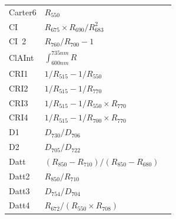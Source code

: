 \documentclass[remotesensing,article,submit,moreauthors,pdftex]{Definitions/mdpi}
\begin{document}
{\begin{supertabular}{lll}
		Carter6         & $R_{550}$                                                                                            & \cite{carter1994}             \\
		CI              & $R_{675}\times R_{690}/R_{683}^2$                                                                    & \cite{zarco-tejada2003}      \\
		CI~2             & $R_{760}/R_{700}-1$                                                                                  & \cite{gitelson2003}           \\
		ClAInt          & $\int_{600 nm}^{735 nm} R$                                                                           & \cite{oppelt2004}             \\
		CRI1            & $1/R_{515}-1/R_{550}$                                                                                & \cite{gitelson2003}           \\
		CRI2            & $1/R_{515}-1/R_{770}$                                                                                & \cite{gitelson2003}           \\
		CRI3            & $1/R_{515}-1/R_{550}\times R_{770}$                                                                  & \cite{gitelson2003}           \\
		CRI4            & $1/R_{515}-1/R_{700}\times R_{770}$                                                                  & \cite{gitelson2003}           \\
		D1              & $D_{730}/D_{706}$                                                                                    & \cite{zarco-tejada2003}      \\
		D2              & $D_{705}/D_{722}$                                                                                    & \cite{zarco-tejada2003}      \\
		Datt            & $(R_{850}-R_{710})/(R_{850}-R_{680})$                                                                & \cite{datt1999}               \\
		Datt2           & $R_{850}/R_{710}$                                                                                    & \cite{datt1999}               \\
		Datt3           & $D_{754}/D_{704}$                                                                                    & \cite{datt1999}               \\
		Datt4           & $R_{672}/(R_{550} \times R_{708})$                                                                   & \cite{datt1998}               \\

\end{supertabular}}
\end{document}
